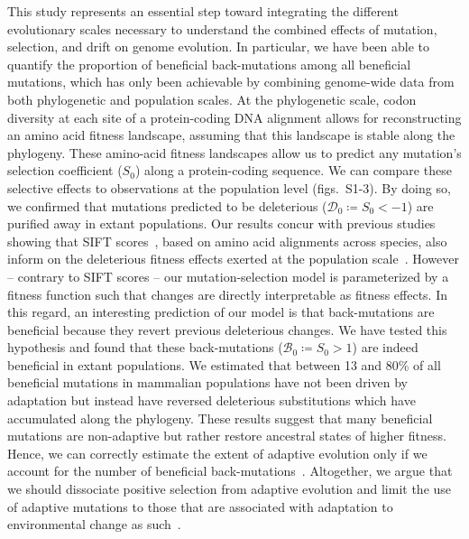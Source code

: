 \documentclass{article}
\newcommand{\Sphy}{S_{0}}
\newcommand{\SphyDel}{\mathcal{D}_0}
\newcommand{\SphyBen}{\mathcal{B}_0}
\begin{document}
    This study represents an essential step toward integrating the different evolutionary scales necessary to understand the combined effects of mutation, selection, and drift on genome evolution.
    In particular, we have been able to quantify the proportion of beneficial back-mutations among all beneficial mutations, which has only been achievable by combining genome-wide data from both phylogenetic and population scales.
    At the phylogenetic scale, codon diversity at each site of a protein-coding DNA alignment allows for reconstructing an amino acid fitness landscape, assuming that this landscape is stable along the phylogeny.
    These amino-acid fitness landscapes allow us to predict any mutation’s selection coefficient ($\Sphy$) along a protein-coding sequence.
    We can compare these selective effects to observations at the population level (figs.~S1-3).
    By doing so, we confirmed that mutations predicted to be deleterious ($\SphyDel \coloneqq \Sphy < -1$) are purified away in extant populations.
    Our results concur with previous studies showing that SIFT scores~\cite{ng_sift_2003, vaser_sift_2016}, based on amino acid alignments across species, also inform on the deleterious fitness effects exerted at the population scale~\cite{chen_hunting_2021}.
    However – contrary to SIFT scores – our mutation-selection model is parameterized by a fitness function such that changes are directly interpretable as fitness effects.
    In this regard, an interesting prediction of our model is that back-mutations are beneficial because they revert previous deleterious changes.
    We have tested this hypothesis and found that these back-mutations ($\SphyBen \coloneqq \Sphy > 1 $) are indeed beneficial in extant populations.
    We estimated that between 13 and 80\% of all beneficial mutations in mammalian populations have not been driven by adaptation but instead have reversed deleterious substitutions which have accumulated along the phylogeny.
    These results suggest that many beneficial mutations are non-adaptive but rather restore ancestral states of higher fitness.
    Hence, we can correctly estimate the extent of adaptive evolution only if we account for the number of beneficial back-mutations~\cite{keightley_what_2010, rice_evolutionarily_2015}.
    Altogether, we argue that we should dissociate positive selection from adaptive evolution and limit the use of adaptive mutations to those that are associated with adaptation to environmental change as such~\cite{charlesworth_other_2007, mustonen_fitness_2009}.
\end{document}
